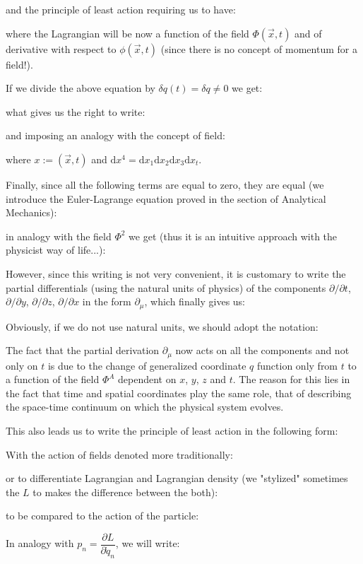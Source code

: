 	and the principle of least action requiring us to have:
	
	where the Lagrangian will be now a function of the field $\Phi(\vec{x},t)$ and of derivative with respect to $\phi(\vec{x},t)$ (since there is no concept of momentum for a field!).
	
	If we divide the above equation by $\delta q(t)=\delta q\neq 0$ we get:
	
	what gives us the right to write:
	
	and imposing an analogy with the concept of field:
	
	where $x:=(\vec{x},t)$ and $\mathrm{d}x^4=\mathrm{d}x_1\mathrm{d}x_2\mathrm{d}x_3\mathrm{d}x_t$.
	
	Finally, since all the following terms are equal to zero, they are equal (we introduce the Euler-Lagrange equation proved in the section of Analytical Mechanics):
	
	in analogy with the field $\Phi^2$ we get (thus it is an intuitive approach with the physicist way of life...):
	
	However, since this writing is not very convenient, it is customary to write the partial differentials (using the natural units of physics) of the components $\partial/\partial t$, $\partial/\partial y$, $\partial / \partial z$, $\partial / \partial x$ in the form $\partial_\mu$, which finally gives us:
	
	Obviously, if we do not use natural units, we should adopt the notation:
	
	The fact that the partial derivation $\partial_\mu$ now acts on all the components and not only on $t$ is due to the change of generalized coordinate $q$ function only from $t$ to a function of the field $\Phi^A$ dependent on $x$, $y$, $z$ and $t$. The reason for this lies in the fact that time and spatial coordinates play the same role, that of describing the space-time continuum on which the physical system evolves.

	This also leads us to write the principle of least action in the following form:
	
	With the action of fields denoted more traditionally:
	
	or to differentiate Lagrangian and Lagrangian density (we "stylized" sometimes the $L$ to makes the difference between the both):
	
	to be compared to the action of the particle:
	
	In analogy with $p_n=\dfrac{\partial L}{\partial \dot{q}_n}$, we will write:
	
